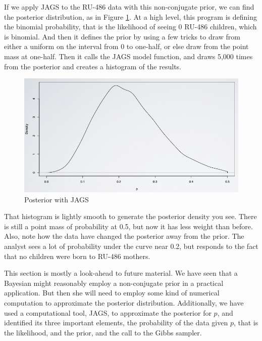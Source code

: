 \documentclass[]{book}
\theoremstyle{definition}
\theoremstyle{definition}
\theoremstyle{definition}
\theoremstyle{remark}
\begin{document}
If we apply JAGS to the RU-486 data with this non-conjugate prior, we
can find the posterior distribution, as in Figure
\ref{fig:JAGS-screenshot}. At a high level, this program is defining the
binomial probability, that is the likelihood of seeing 0 RU-486
children, which is binomial. And then it defines the prior by using a
few tricks to draw from either a uniform on the interval from 0 to
one-half, or else draw from the point mass at one-half. Then it calls
the JAGS model function, and draws 5,000 times from the posterior and
creates a histogram of the results.

\begin{figure}

{\centering \includegraphics[width=11.24in]{JAGS_screenshot} 

}

\caption{Posterior with JAGS}\label{fig:JAGS-screenshot}
\end{figure}

That histogram is lightly smooth to generate the posterior density you
see. There is still a point mass of probability at 0.5, but now it has
less weight than before. Also, note how the data have changed the
posterior away from the prior. The analyst sees a lot of probability
under the curve near 0.2, but responds to the fact that no children were
born to RU-486 mothers.

This section is mostly a look-ahead to future material. We have seen
that a Bayesian might reasonably employ a non-conjugate prior in a
practical application. But then she will need to employ some kind of
numerical computation to approximate the posterior distribution.
Additionally, we have used a computational tool, JAGS, to approximate
the posterior for \(p\), and identified its three important elements,
the probability of the data given \(p\), that is the likelihood, and the
prior, and the call to the Gibbs sampler.
\end{document}
